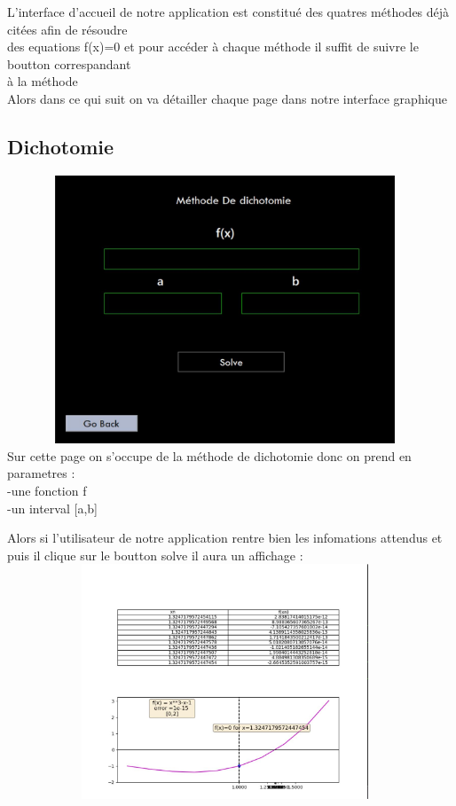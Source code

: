 \documentclass{article}
\begin{document}
L'interface d'accueil de notre application est constitué des quatres méthodes déjà citées afin de résoudre \\ des equations f(x)=0 et pour accéder à chaque méthode il suffit de suivre le boutton correspandant \\
à la méthode\\
Alors dans ce qui suit on va détailler chaque page dans notre interface graphique 

\subsection{Dichotomie}
\includegraphics[width=13cm,height=8cm]{img/dicho.JPG}\\

Sur cette page on s'occupe de la méthode de dichotomie donc on prend en parametres :\\
-une fonction f\\
-un interval [a,b]

Alors si l'utilisateur de notre application rentre bien les infomations attendus et puis il clique sur le boutton solve il aura un affichage :\\
\includegraphics[width=13cm,height=7cm]{img/dicho_graph.JPG}\\
\end{document}
